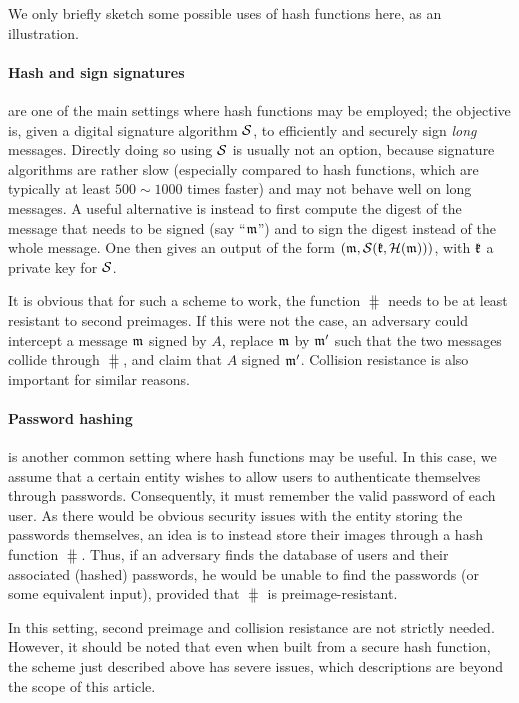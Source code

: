 We only briefly sketch some possible uses of hash functions here, as an illustration.

\paragraph{Hash and sign signatures} are one of the main settings where hash functions may be employed; the objective is, given a digital signature
algorithm $\operatorname{\mathcal{S}}$, to efficiently and securely sign \emph{long} messages. Directly doing so using $\operatorname{\mathcal{S}}$ is usually not an option, because signature algorithms are rather slow (especially compared
to hash functions, which are typically at least $500 \sim 1000$ times faster) and may not behave well on long messages. A useful alternative is instead to first compute the digest of the
message that needs to be signed (say ``$\mathfrak{m}$'') and to sign the digest instead of the whole message. One then gives an output of the form $(\mathfrak{m}, \operatorname{\mathcal{S}}(\mathfrak{k},\operatorname{\mathcal{H}}(\mathfrak{m})))$, with $\mathfrak{k}$ a private key for $\operatorname{\mathcal{S}}$. 

It is obvious that for such a scheme to work, the function $\hash$ needs to be at least resistant to second preimages. If this were not the case, an adversary could intercept a message $\mathfrak{m}$
signed by $A$, replace $\mathfrak{m}$ by $\mathfrak{m}'$ such that the two messages collide through $\hash$, and claim that $A$ signed $\mathfrak{m}'$.
Collision resistance is also important for similar reasons.

\paragraph{Password hashing} is another common setting where hash functions may be useful. In this case, we assume that a certain entity wishes to allow users to authenticate themselves
through passwords. Consequently, it must remember the valid password of each user. As there would be obvious security issues with the entity storing the passwords themselves, an idea
is to instead store their images through a hash function $\hash$. Thus, if an adversary finds the database of users and their associated (hashed) passwords, he would be unable to find
the passwords (or some equivalent input), provided that $\hash$ is preimage-resistant.

In this setting, second preimage and collision resistance are not strictly needed. However, it should be noted that even when built from a secure hash function,
the scheme just described above has severe issues, which descriptions are beyond the scope of this article.

